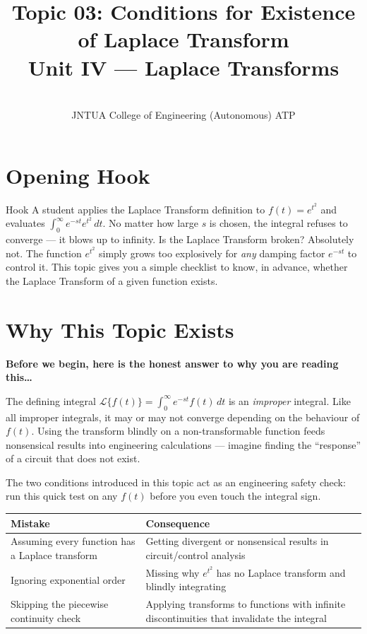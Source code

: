 \documentclass[12pt,a4paper]{article}
\title{Topic 03: Conditions for Existence of Laplace Transform \\
       \large Unit IV --- Laplace Transforms}
\author{ \\
        JNTUA College of Engineering (Autonomous) ATP}
\date{}
\begin{document}
\maketitle
\tableofcontents
\newpage

\section{Opening Hook}

\begin{curiositybox}{Hook}
A student applies the Laplace Transform definition to $f(t) = e^{t^2}$ and evaluates
$\int_0^\infty e^{-st} e^{t^2}\, dt$.
No matter how large $s$ is chosen, the integral refuses to converge --- it blows up to infinity.
Is the Laplace Transform broken?  Absolutely not.
The function $e^{t^2}$ simply grows too explosively for \emph{any} damping factor $e^{-st}$ to
control it.
This topic gives you a simple checklist to know, in advance, whether the Laplace Transform of a
given function exists.
\end{curiositybox}

\section{Why This Topic Exists}

\textbf{Before we begin, here is the honest answer to why you are reading this\ldots}

The defining integral $\mathcal{L}\{f(t)\} = \int_0^\infty e^{-st} f(t)\, dt$ is an
\emph{improper} integral.
Like all improper integrals, it may or may not converge depending on the behaviour of $f(t)$.
Using the transform blindly on a non-transformable function feeds nonsensical results into
engineering calculations --- imagine finding the ``response'' of a circuit that does not exist.

The two conditions introduced in this topic act as an engineering safety check: run this quick
test on any $f(t)$ before you even touch the integral sign.

\medskip
\begin{center}
\begin{tabular}{@{}p{} p{}@{}}
\toprule
\textbf{Mistake} & \textbf{Consequence} \\
\midrule
Assuming every function has a Laplace transform &
Getting divergent or nonsensical results in circuit/control analysis \\
\midrule
Ignoring exponential order &
Missing why $e^{t^2}$ has no Laplace transform and blindly integrating \\
\midrule
Skipping the piecewise continuity check &
Applying transforms to functions with infinite discontinuities that invalidate the integral \\
\bottomrule
\end{tabular}
\end{center}
\medskip
\end{document}
